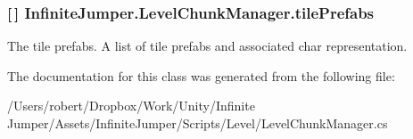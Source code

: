 \subsubsection[{tile\+Prefabs}]{ \mbox{[}$\,$\mbox{]} Infinite\+Jumper.\+Level\+Chunk\+Manager.\+tile\+Prefabs}\label{class_infinite_jumper_1_1_level_chunk_manager_a0665ca9547c77c3818c123194d3f6016}


The tile prefabs. A list of tile prefabs and associated char representation. 



The documentation for this class was generated from the following file\+:\begin{DoxyCompactItemize}
\item 
/\+Users/robert/\+Dropbox/\+Work/\+Unity/\+Infinite Jumper/\+Assets/\+Infinite\+Jumper/\+Scripts/\+Level/Level\+Chunk\+Manager.\+cs\end{DoxyCompactItemize}
